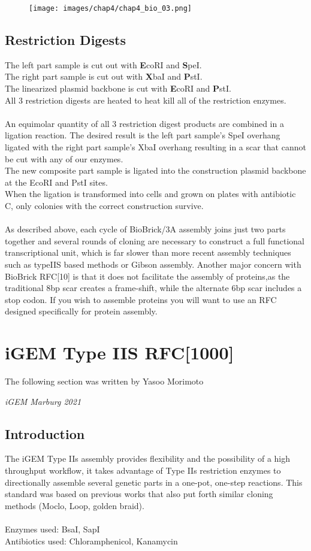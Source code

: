 \begin{figure}[!htbp]
    \centering
    \texttt{[image: images/chap4/chap4\_bio\_03.png]}
    \label{fig:ch4bio03}
\end{figure}
\FloatBarrier


\subsection*{Restriction Digests}
The left part sample is cut out with \textbf{E}coRI and \textbf{S}peI. \\ 
The right part sample is cut out with \textbf{X}baI and \textbf{P}stI. \\
The linearized plasmid backbone is cut with \textbf{E}coRI and \textbf{P}stI. \\
All 3 restriction digests are heated to heat kill all of the restriction enzymes. \\ \\
An equimolar quantity of all 3 restriction digest products are combined in a ligation reaction.
The desired result is the left part sample's SpeI overhang ligated with the right part sample's XbaI overhang resulting in a scar that cannot be cut with any of our enzymes. \\
The new composite part sample is ligated into the construction plasmid backbone at the EcoRI and PstI sites. \\
When the ligation is transformed into cells and grown on plates with antibiotic C, only colonies with the correct construction survive. \\ \\
As described above, each cycle of BioBrick/3A assembly joins just two parts together and several rounds of cloning are necessary to construct a full functional transcriptional unit, which is far slower than more recent assembly techniques such as typeIIS based methods or Gibson assembly. Another major concern with BioBrick RFC[10] is that it does not facilitate the assembly of proteins,as the traditional 8bp scar creates a frame-shift, while the alternate 6bp scar includes a stop codon. If you wish to assemble proteins you will want to use an RFC designed specifically for protein assembly.


\section{iGEM Type IIS RFC[1000]}
\epigraph{The following section was written by Yasoo Morimoto}{\textit{iGEM Marburg 2021}}
\subsection*{Introduction}
The iGEM Type IIs assembly provides flexibility and the possibility of a high throughput workflow, it takes advantage of Type IIs restriction enzymes to directionally assemble several genetic parts in a one-pot, one-step reactions. This standard was based on previous works that also put forth similar cloning methods (Moclo, Loop, golden braid). \\ \\ 
Enzymes used: BsaI, SapI \\
Antibiotics used: Chloramphenicol, Kanamycin

